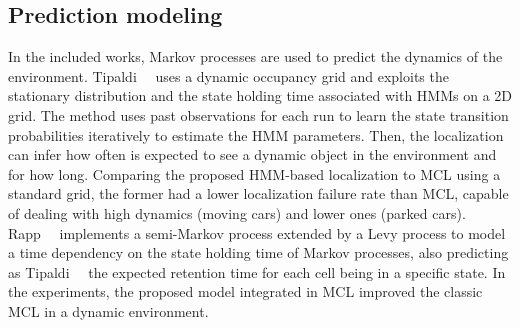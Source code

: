 \subsection{Prediction modeling}\label{sec:slam-dynamic:predict}

In the included works, Markov processes are used to predict the dynamics of the environment.
Tipaldi~\etal~\cite{tipaldi-et-al:2013:0278364913502830} uses a dynamic occupancy grid and exploits the stationary distribution and the state holding time associated with \glspl{HMM} on a 2D grid. The method uses past observations for each run to learn the state transition probabilities iteratively to estimate the \gls{HMM} parameters. Then, the localization can infer how often is expected to see a dynamic object in the environment and for how long. Comparing the proposed \gls{HMM}-based localization to \gls{MCL} using a standard grid, the former had a lower localization failure rate than \gls{MCL}, capable of dealing with high dynamics (moving cars) and lower ones (parked cars).
Rapp~\etal~\cite{rapp-et-al:2015:77} implements a semi-Markov process extended by a Levy process to model a time dependency on the state holding time of Markov processes, also predicting as Tipaldi~\etal~\cite{tipaldi-et-al:2013:0278364913502830} the expected retention time for each cell being in a specific state. In the experiments, the proposed model \cite{rapp-et-al:2015:77} integrated in \gls{MCL} improved the classic \gls{MCL} in a dynamic environment.

